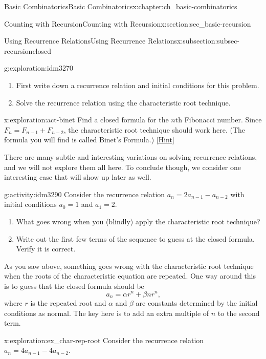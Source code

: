 \documentclass[oneside,10pt,]{book}
\numberwithin{equation}{chapter}
\begin{document}
\begin{chapterptx}{Basic Combinatorics}{}{Basic Combinatorics}{}{}{x:chapter:ch_basic-combinatorics}
\begin{sectionptx}{Counting with Recursion}{}{Counting with Recursion}{}{}{x:section:sec_basic-recursion}
\begin{subsectionptx}{Using Recurrence Relations}{}{Using Recurrence Relations}{}{}{x:subsection:subsec-recursionclosed}
\begin{exploration}{}{g:exploration:idm3270}
\begin{enumerate}[font=\bfseries,label=(\alph*),ref=\alph*]
\item{}First write down a recurrence relation and initial conditions for this problem.%
\item{}Solve the recurrence relation using the characteristic root technique.%
\end{enumerate}
\end{exploration}
\begin{exploration}{}{x:exploration:act-binet}%
Find a closed formula for the \(n\)th Fibonacci number.  Since \(F_n = F_{n-1} + F_{n-2}\), the characteristic root technique should work here.  (The formula you will find is called Binet's Formula.)%
\space\hspace*{0pt}\hfill{\tiny\hyperlink{g:hint:idm3285-back}{[Hint]}}\end{exploration}
There are many subtle and interesting variations on solving recurrence relations, and we will not explore them all here.  To conclude though, we consider one interesting case that will show up later as well.%
\begin{activity}{}{g:activity:idm3290}%
Consider the recurrence relation \(a_n = 2a_{n-1} - a_{n-2}\) with initial conditions \(a_0 = 1\) and \(a_1 = 2\).%
\begin{enumerate}[font=\bfseries,label=(\alph*),ref=\alph*]
\item{}What goes wrong when you (blindly) apply the characteristic root technique?%
\item{}Write out the first few terms of the sequence to guess at the closed formula.  Verify it is correct.%
\end{enumerate}
\end{activity}
As you saw above, something goes wrong with the characteristic root technique when the roots of the characteristic equation are repeated.  One way around this is to guess that the closed formula should be%
\begin{equation*}
a_n = \alpha r^n + \beta nr^n\text{,}
\end{equation*}
where \(r\) is the repeated root and \(\alpha\) and \(\beta\) are constants determined by the initial conditions as normal. The key here is to add an extra multiple of \(n\) to the second term.%
\begin{exploration}{}{x:exploration:ex_char-rep-root}%
Consider the recurrence relation \(a_n = 4a_{n-1} - 4a_{n-2}\).%
\begin{enumerate}[font=\bfseries,label=(\alph*),ref=\alph*]

\end{enumerate}
\end{exploration}
\end{subsectionptx}
\end{sectionptx}
\end{chapterptx}
\end{document}

